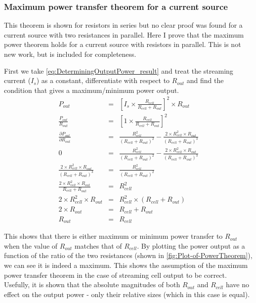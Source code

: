     \subsubsection*{Maximum power transfer theorem for a current source}


      This theorem is shown for resistors in series but no clear proof was found for a current source with two resistances in parallel.
      Here I prove that the maximum power theorem holds for a current source with resistors in parallel.
      This is not new work, but is included for completeness.

      First we take \cref{eq:DeterminingOutputPower_result} and treat the streaming current ($I_{s}$) as a constant, differentiate with respect to $R_{out}$ and find the condition that gives a maximum/minimum power output.
      \begin{eqnarray}
          P_{out} & = & \left[I_{s}\times\frac{R_{cell}}{R_{cell}+R_{out}}\right]^{2}\times R_{out}\nonumber\\
          \frac{P_{out}}{R_{out}} & = & \left[1\times\frac{R_{cell}}{R_{cell}+R_{out}}\right]^{2}\nonumber\\
          \frac{\partial P_{out}}{\partial R_{out}} & = & \frac{R_{cell}^{2}}{(R_{cell}+R_{out})^{2}}-\frac{2\times R_{cell}^{2}\times R_{out}}{(R_{cell}+R_{out})^{3}}\nonumber\\
          0 & = & \frac{R_{cell}^{2}}{(R_{cell}+R_{out})^{2}}-\frac{2\times R_{cell}^{2}\times R_{out}}{(R_{cell}+R_{out})^{3}}\nonumber\\
          \frac{2\times R_{cell}^{2}\times R_{out}}{(R_{cell}+R_{out})^{3}} & = & \frac{R_{cell}^{2}}{(R_{cell}+R_{out})^{2}}\nonumber\\
          \frac{2\times R_{cell}^{2}\times R_{out}}{R_{cell}+R_{out}} & = & R_{cell}^{2}\nonumber\\
          2\times R_{cell}^{2}\times R_{out} & = & R_{cell}^{2}\times(R_{cell}+R_{out})\nonumber\\
          2\times R_{out} & = & R_{cell}+R_{out}\nonumber\\
          R_{out} & = & R_{cell}
          \label{eq:maximumPowerTheorem_norton}
      \end{eqnarray}

      This shows that there is either maximum or minimum power transfer to $R_{out}$ when the value of $R_{out}$ matches that of $R_{cell}$.
      By plotting the power output as a function of the ratio of the two resistances (shown in \cref{fig:Plot-of-PowerTheorem}), we can see it is indeed a maximum.
      This shows the assumption of the maximum power transfer theorem in the case of streaming cell output to be correct.
      Usefully, it is shown that the absolute magnitudes of both $R_{out}$ and $R_{cell}$ have no effect on the output power - only their relative sizes (which in this case is equal).

